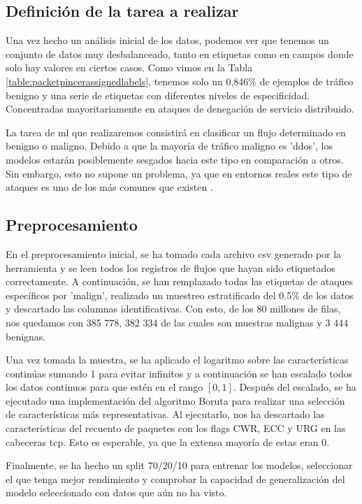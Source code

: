 \subsection{Definición de la tarea a realizar}

Una vez hecho un análisis inicial de los datos, podemos ver que tenemos un conjunto de datos muy desbalanceado, tanto en etiquetas como en campos donde solo hay valores en ciertos casos. Como vimos en la Tabla \ref{table:packetpincerassignedlabels}, tenemos solo un 0,846\% de ejemplos de tráfico benigno y una serie de etiquetas con diferentes niveles de especificidad. Concentradas mayoritariamente en ataques de denegación de servicio distribuido. 

La tarea de \acrshort{ml} que realizaremos consistirá en clasificar un flujo determinado en benigno o maligno. Debido a que la mayoría de tráfico maligno es 'ddos', los modelos estarán posiblemente sesgados hacia este tipo en comparación a otros. Sin embargo, esto no supone un problema, ya que en entornos reales este tipo de ataques es uno de los más comunes que existen \cite{topciberattacks}.

\subsection{Preprocesamiento}

En el preprocesamiento inicial, se ha tomado cada archivo \acrshort{csv} generado por la herramienta y se leen todos los registros de flujos que hayan sido etiquetados correctamente. A continuación, se han remplazado todas las etiquetas de ataques específicos por 'malign', realizado un muestreo estratificado del 0.5\% de los datos y descartado las columnas identificativas. Con esto, de los 80 millones de filas, nos quedamos con 385 778, 382 334 de las cuales son muestras malignas y 3 444 benignas.

Una vez tomada la muestra, se ha aplicado el logaritmo sobre las características continúas sumando 1 para evitar infinitos y a continuación se han escalado todos los datos continuos para que estén en el rango $[0, 1]$. Después del escalado, se ha ejecutado una implementación del algoritmo Boruta \cite{borutapy} para realizar una selección de características más representativas. Al ejecutarlo, nos ha descartado las características del recuento de paquetes con los flags CWR, ECC y URG en las cabeceras \acrshort{tcp}. Esto es esperable, ya que la extensa mayoría de estas eran 0.

Finalmente, se ha hecho un split 70/20/10 para entrenar los modelos, seleccionar el que tenga mejor rendimiento y comprobar la capacidad de generalización del modelo seleccionado con datos que aún no ha visto. 

